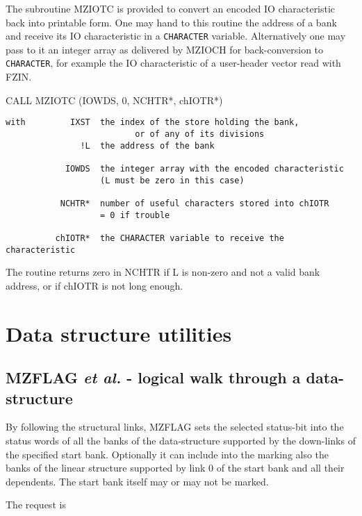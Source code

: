 The subroutine MZIOTC is provided to convert an encoded
IO characteristic back into printable form.
One may hand to this routine the address of a bank and
receive its IO characteristic in a {\tt CHARACTER} variable.
Alternatively one may pass to it an integer array as delivered
by MZIOCH for back-conversion to {\tt CHARACTER},
for example the IO characteristic of a user-header vector
read with FZIN.

       {CALL MZIOTC (IOWDS, 0, NCHTR*, chIOTR*)}
\begin{verbatim}
with         IXST  the index of the store holding the bank,
                          or of any of its divisions
               !L  the address of the bank

            IOWDS  the integer array with the encoded characteristic
                   (L must be zero in this case)

           NCHTR*  number of useful characters stored into chIOTR
                   = 0 if trouble

          chIOTR*  the CHARACTER variable to receive the characteristic
\end{verbatim} 
The routine returns zero in NCHTR if L is non-zero and not
a valid bank address,
or if chIOTR is not long enough.

\chapter{Data structure utilities}
\label{sec:H1-Data-structure-utilities}

\section{MZFLAG {\it et al.} - logical walk through a data-structure}

By following the structural links,
MZFLAG sets the selected status-bit into the status words
of all the banks of the data-structure supported
by the down-links of the specified start bank.
Optionally it can include into the marking
also the banks of the linear structure supported
by link 0 of the start bank and all their dependents.
The start bank itself may or may not be marked.

The request is

